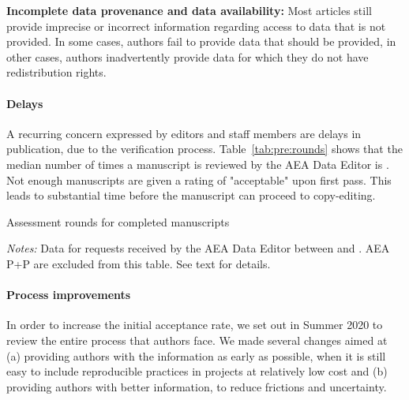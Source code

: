 \documentclass[PP]{AEA}
\renewcommand{\subparagraph}[1]{\textbf{#1}}
\begin{document}
\subparagraph{Incomplete data provenance and data availability:} Most articles still provide imprecise or incorrect information regarding access to data that is not provided. In some cases, authors fail to provide data that should be provided, in other cases, authors inadvertently provide data for which they do not have redistribution rights. 

\paragraph{Delays} 

A recurring concern expressed by editors and staff members are delays in publication, due to the verification process. Table~\ref{tab:pre:rounds} shows that the median number of times a manuscript is reviewed by the AEA Data Editor is \medianrounds{}. Not enough manuscripts are given a rating of "acceptable" upon first pass. This leads to substantial time before the manuscript can proceed to copy-editing.



\begin{table}
    \centering
    \caption{Assessment rounds for completed manuscripts}
    \label{tab:pre:rounds}
    \begin{threeparttable}
    \centering
    
    \begin{tablenotes}
    \item[] \textit{Notes:} Data for requests received by the AEA Data Editor between \firstday{} and \lastday{}. AEA P+P are excluded from this table. See text for details.
    \end{tablenotes}
 \end{threeparttable}
\end{table}


\paragraph{Process improvements}

In order to increase the initial acceptance rate, we set out in Summer 2020 to review the entire process that authors face. We made several changes aimed at (a) providing authors with the information as early as possible, when it is still easy to include reproducible practices in projects at relatively low cost and (b) providing authors with better information, to reduce frictions and uncertainty. 
\end{document}
